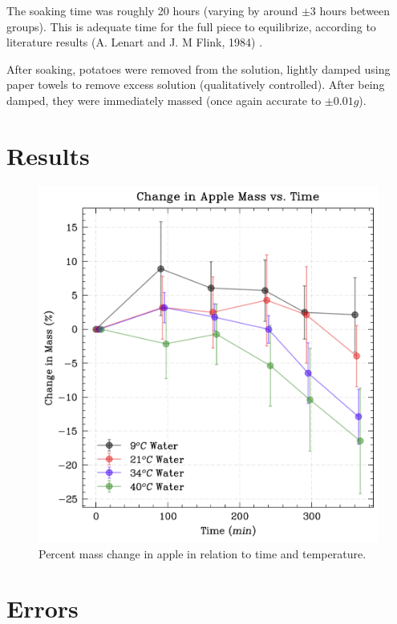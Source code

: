 \documentclass[prl,twocolumn,amsmath,amssymb,superscriptaddress]{revtex4-2}
\begin{document}
The soaking time was roughly 20 hours (varying by around $\pm 3$ hours between groups). This is adequate time for the full piece to equilibrize, according to literature results  (A. Lenart and J. M Flink, 1984) \cite{https://doi.org/10.1111/j.1365-2621.1984.tb00327.x}.

After soaking, potatoes were removed from the solution, lightly damped using paper towels to remove excess solution (qualitatively controlled). After being damped, they were immediately massed (once again accurate to $\pm 0.01g$).


\section{Results}

\begin{figure}[htb]
    \includegraphics[width=1\linewidth]{change_in_mass.png}
    \caption{Percent mass change in apple in relation to time and temperature.}
    \label{fig:RelativeMassChange}
\end{figure}


\section{Errors}


\end{document}
